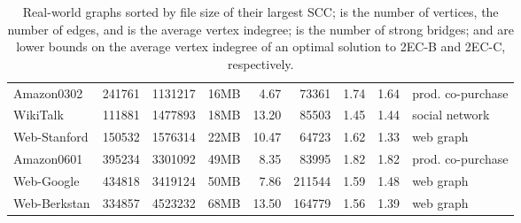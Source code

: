 \documentclass[11pt]{article}
\begin{document}
\begin{table}[!ht]
\begin{adjustbox}{width=\textwidth,totalheight=\textheight,keepaspectratio}
\begin{small}
\begin{tabular}{l|rrrrrrr|l}
Amazon0302       & 241761     & 1131217    & 16MB               & 4.67                    & 73361                   & 1.74                              & 1.64                                                  & prod. co-purchase                 \\
WikiTalk         & 111881     & 1477893    & 18MB               & 13.20                   & 85503                   & 1.45                              & 1.44                                                  & social network                    \\
Web-Stanford     & 150532     & 1576314    & 22MB               & 10.47                   & 64723                   & 1.62                              & 1.33                                                  & web graph                         \\
Amazon0601       & 395234     & 3301092    & 49MB               & 8.35                    & 83995                   & 1.82                              & 1.82                                                  & prod. co-purchase                 \\
Web-Google       & 434818     & 3419124    & 50MB               & 7.86                    & 211544                  & 1.59                              & 1.48                                                  & web graph                         \\
Web-Berkstan     & 334857     & 4523232    & 68MB               & 13.50                   & 164779                  & 1.56                              & 1.39                                           & web graph\\
\hline \end{tabular}
 \end{small}
\end{adjustbox}
\caption{Real-world graphs sorted by file size of their largest
SCC;  is the number of vertices,  the number of edges, and
 is the average vertex indegree;  is the
number of strong bridges;  and
 are lower bounds on the average vertex indegree
of an optimal solution to \textsf{2EC-B} and \textsf{2EC-C},
respectively.}\label{tab:datasets}
\end{table}
\end{document}
